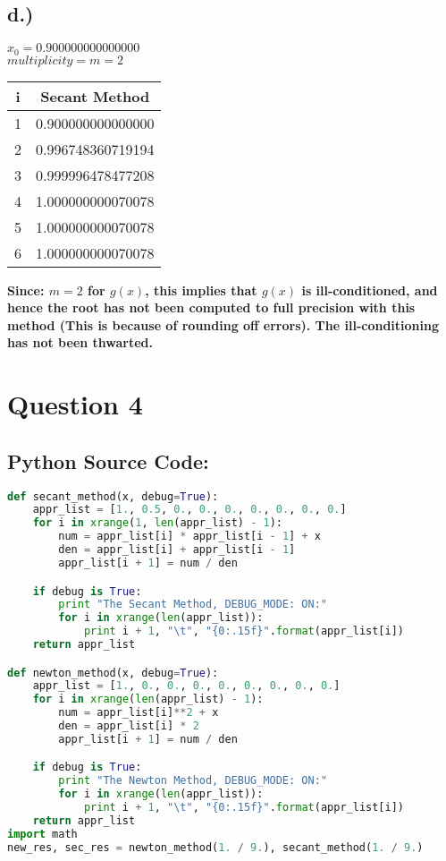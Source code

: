 \documentclass{article}
\begin{document}
\subsection*{d.)}
\textbf{$x_0 = 0.900000000000000$ \\ $multiplicity = m = 2$}
\begin{center}
    \begin{tabular}{||c c||}
    \hline
    \textbf{i} & \textbf{Secant Method} \\ [0.5ex]
    \hline\hline
    1 & 0.900000000000000 \\ [1ex]
    \hline
    2 & 0.996748360719194 \\ [1ex]
    \hline
    3 & 0.999996478477208 \\ [1ex]
    \hline
    4 & 1.000000000070078 \\ [1ex]
    \hline
    5 & 1.000000000070078 \\ [1ex]
    \hline
    6 & 1.000000000070078 \\ [1ex]
    \hline
    \end{tabular}
\end{center}
\textbf{Since: $m = 2$ for $g(x)$, this implies that $g(x)$ is ill-conditioned, and hence the root has not been computed to full precision with this method (This is because of rounding off errors). The ill-conditioning has not been thwarted.}


\section*{Question 4}
\subsection*{Python Source Code: }
\begin{lstlisting}[language=Python]
def secant_method(x, debug=True):
    appr_list = [1., 0.5, 0., 0., 0., 0., 0., 0., 0.]
    for i in xrange(1, len(appr_list) - 1):
        num = appr_list[i] * appr_list[i - 1] + x
        den = appr_list[i] + appr_list[i - 1]
        appr_list[i + 1] = num / den

    if debug is True:
        print "The Secant Method, DEBUG_MODE: ON:"
        for i in xrange(len(appr_list)):
            print i + 1, "\t", "{0:.15f}".format(appr_list[i])
    return appr_list

def newton_method(x, debug=True):
    appr_list = [1., 0., 0., 0., 0., 0., 0., 0., 0.]
    for i in xrange(len(appr_list) - 1):
        num = appr_list[i]**2 + x
        den = appr_list[i] * 2
        appr_list[i + 1] = num / den

    if debug is True:
        print "The Newton Method, DEBUG_MODE: ON:"
        for i in xrange(len(appr_list)):
            print i + 1, "\t", "{0:.15f}".format(appr_list[i])
    return appr_list
import math
new_res, sec_res = newton_method(1. / 9.), secant_method(1. / 9.)
\end{lstlisting}
\end{document}
